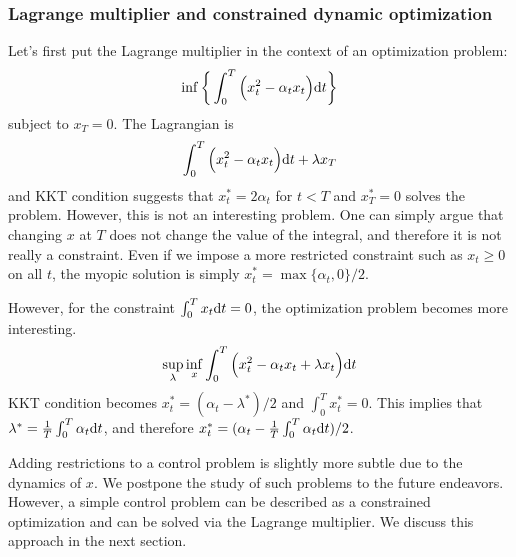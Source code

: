 \documentclass[11pt]{book}
\newcommand{\dt}{\text{\normalfont d}t}
\begin{document}
\subsubsection{Lagrange multiplier and constrained dynamic optimization}
Let's first put the Lagrange multiplier in the context of an optimization problem:
    \begin{equation}
        \inf\bigg\{\int_0^T\Big(x_t^2 - \alpha_t x_t\Big) {{\dt}}\bigg\}
    \end{equation}
subject to $x_T=0$. The Lagrangian is
\begin{equation}
    \int_0^T\Big(x_t^2 - \alpha_t x_t\Big) {{\dt}} + \lambda x_T
\end{equation}
and KKT condition suggests that $x^*_t=2\alpha_t$ for $t<T$ and $x^*_T=0$ solves the problem. However, this is not an interesting problem. One can simply argue that changing $x$ at $T$ does not change the value of the integral, and therefore it is not really a constraint. Even if we impose a more restricted constraint such as $x_t\ge0$ on all $t$, the myopic solution is simply $x^*_t=\max\{\alpha_t,0\}/2$.

However, for the constraint $\int_0^T x_t{{\dt}} = 0$, the optimization problem becomes more interesting.
\begin{equation}
        \sup_{\lambda}\inf_{x}\int_0^T\Big(x_t^2 - \alpha_t x_t + \lambda x_t\Big) {{\dt}} 
\end{equation}
KKT condition becomes $x^*_t =   (\alpha_t - \lambda^* )/2$ and $\int_0^Tx^*_t=0$. This implies that $\lambda^* = \frac{1}{T}\int_0^T\alpha_t{{\dt}}$, and therefore $x^*_t =   (\alpha_t - \frac{1}{T}\int_0^T\alpha_t{{\dt}} )/2$. 

Adding restrictions to a control problem is slightly more subtle due to the dynamics of $x$. We postpone the study of such problems to the future endeavors. However, a simple control problem can be described as a constrained optimization and can be solved via the Lagrange multiplier. We discuss this approach in the next section.
\end{document}
